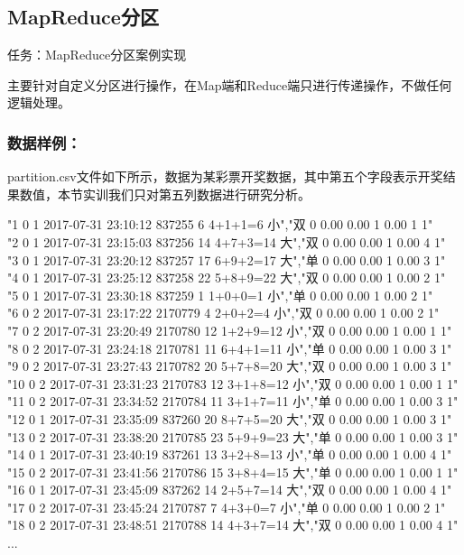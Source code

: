 \documentclass {article}
\begin{document}
		\subsection{MapReduce分区}
			任务：MapReduce分区案例实现
			
			主要针对自定义分区进行操作，在Map端和Reduce端只进行传递操作，不做任何逻辑处理。
			\subsubsection{数据样例：}
				partition.csv文件如下所示，数据为某彩票开奖数据，其中第五个字段表示开奖结果数值，本节实训我们只对第五列数据进行研究分析。
				
				"1	0	1	2017-07-31 23:10:12	837255	6	4+1+1=6	小","双	0	0.00	0.00	1	0.00	1	1" \\
				"2	0	1	2017-07-31 23:15:03	837256	14	4+7+3=14	大","双	0	0.00	0.00	1	0.00	4	1" \\ 
				"3	0	1	2017-07-31 23:20:12	837257	17	6+9+2=17	大","单	0	0.00	0.00	1	0.00	3	1" \\
				"4	0	1	2017-07-31 23:25:12	837258	22	5+8+9=22	大","双	0	0.00	0.00	1	0.00	2	1" \\
				"5	0	1	2017-07-31 23:30:18	837259	1	1+0+0=1	小","单	0	0.00	0.00	1	0.00	2	1" \\
				"6	0	2	2017-07-31 23:17:22	2170779	4	2+0+2=4	小","双	0	0.00	0.00	1	0.00	2	1" \\
				"7	0	2	2017-07-31 23:20:49	2170780	12	1+2+9=12	小","双	0	0.00	0.00	1	0.00	1	1" \\
				"8	0	2	2017-07-31 23:24:18	2170781	11	6+4+1=11	小","单	0	0.00	0.00	1	0.00	3	1" \\
				"9	0	2	2017-07-31 23:27:43	2170782	20	5+7+8=20	大","双	0	0.00	0.00	1	0.00	3	1" \\
				"10	0	2	2017-07-31 23:31:23	2170783	12	3+1+8=12	小","双	0	0.00	0.00	1	0.00	1	1" \\
				"11	0	2	2017-07-31 23:34:52	2170784	11	3+1+7=11	小","单	0	0.00	0.00	1	0.00	3	1" \\
				"12	0	1	2017-07-31 23:35:09	837260	20	8+7+5=20	大","双	0	0.00	0.00	1	0.00	3	1" \\
				"13	0	2	2017-07-31 23:38:20	2170785	23	5+9+9=23	大","单	0	0.00	0.00	1	0.00	3	1" \\
				"14	0	1	2017-07-31 23:40:19	837261	13	3+2+8=13	小","单	0	0.00	0.00	1	0.00	4	1" \\
				"15	0	2	2017-07-31 23:41:56	2170786	15	3+8+4=15	大","单	0	0.00	0.00	1	0.00	1	1" \\
				"16	0	1	2017-07-31 23:45:09	837262	14	2+5+7=14	大","双	0	0.00	0.00	1	0.00	4	1" \\
				"17	0	2	2017-07-31 23:45:24	2170787	7	4+3+0=7	小","单	0	0.00	0.00	1	0.00	2	1" \\
				"18	0	2	2017-07-31 23:48:51	2170788	14	4+3+7=14	大","双	0	0.00	0.00	1	0.00	4	1" \\
				...
				
\end{document}
